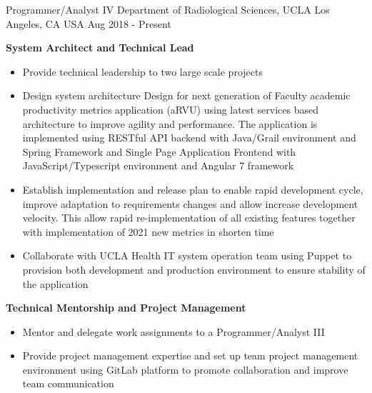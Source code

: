 


\begin{cventries}


	
  \cventry
    {Programmer/Analyst IV} %
    {Department of Radiological Sciences, UCLA} %
    {Los Angeles, CA USA} %
    {Aug 2018 - Present} %
    {
      \begin{cvitems} %
        \item[] { {\bf System Architect and Technical Lead}
            \begin{itemize} %
                \item {Provide technical leadership to two large scale projects}
                \item {Design system architecture Design for next generation of Faculty academic productivity metrics application (aRVU) using latest services based architecture to improve agility and performance. The application is implemented using RESTful API backend with Java/Grail environment and Spring Framework and Single Page Application Frontend with JavaScript/Typescript environment and Angular 7 framework}
                \item {Establish implementation and release plan to enable rapid development cycle, improve adaptation to requirements changes and allow increase development velocity. This allow rapid re-implementation of all existing features together with implementation of 2021 new metrics in shorten time}
                \item {Collaborate with UCLA Health IT system operation team using Puppet to provision both development and production environment to ensure stability of the application}
              \end{itemize}}
        \item[] { {\bf Technical Mentorship and Project Management} 
            \begin{itemize} %
                \item {Mentor and delegate work assignments to a Programmer/Analyst III}
                \item {Provide project management expertise and set up team project management environment using GitLab platform to promote collaboration and improve team communication}
              \end{itemize}}
      \end{cvitems}
    }



\end{cventries}
